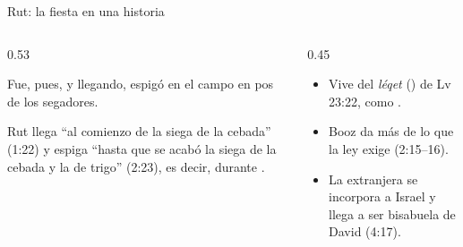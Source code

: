 \begin{frame}{Rut: la fiesta en una historia}
\begin{columns}[c,onlytextwidth]
\begin{column}{0.53\textwidth}
\centering{}
\begin{cita}Fue, pues, y llegando, espigó en el campo en pos de los segadores.\end{cita}
\small\RaggedRight Rut llega ``al comienzo de la siega de la cebada'' (1:22) y espiga ``hasta que se acabó la siega de la cebada y la de trigo'' (2:23), es decir, durante .
\end{column}
\begin{column}{0.45\textwidth}\small
\begin{itemize}
\item Vive del \emph{léqet} () de Lv 23:22, como .
\item Booz da más de lo que la ley exige (2:15--16).
\item La extranjera se incorpora a Israel y llega a ser bisabuela de David (4:17).
\end{itemize}\smallskip
{}
\end{column}
\end{columns}
\end{frame}

